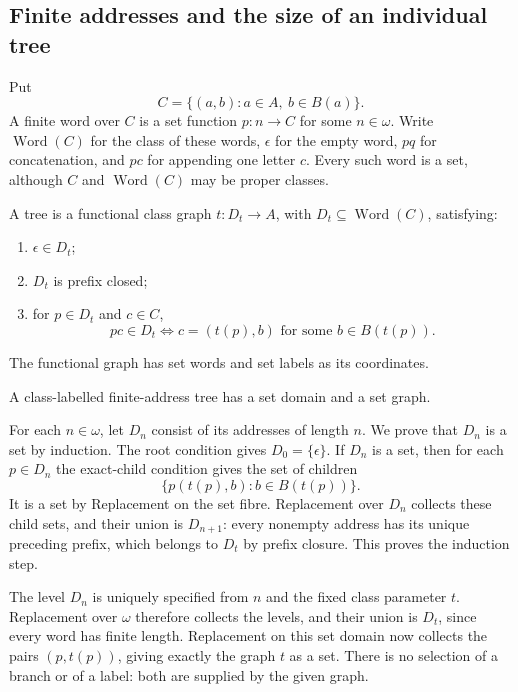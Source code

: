 \subsection{Finite addresses and the size of an individual tree}
Put
\[
C=\{(a,b):a\in A,\ b\in B(a)\}.
\]
A finite word over $C$ is a set function $p:n\to C$ for some
$n\in\omega$. Write $\operatorname{Word}(C)$ for the class of these
words, $\epsilon$ for the empty word, $pq$ for concatenation, and
$pc$ for appending one letter $c$. Every such word is a set, although
$C$ and $\operatorname{Word}(C)$ may be proper classes.

\begin{definition}
A tree is a functional class graph $t:D_t\to A$, with
$D_t\subseteq\operatorname{Word}(C)$, satisfying:
\begin{enumerate}
\item $\epsilon\in D_t$;
\item $D_t$ is prefix closed;
\item for $p\in D_t$ and $c\in C$,
\[
pc\in D_t\iff c=(t(p),b)\text{ for some }b\in B(t(p)).
\]
\end{enumerate}
The functional graph has set words and set labels as its coordinates.
\end{definition}

\begin{lemma}
\label{lem:class_tree_is_set}
A class-labelled finite-address tree has a set domain and a set graph.
\end{lemma}
\Proof
For each $n\in\omega$, let $D_n$ consist of its addresses of length
$n$. We prove that $D_n$ is a set by induction. The root condition
gives $D_0=\{\epsilon\}$. If $D_n$ is a set, then for each
$p\in D_n$ the exact-child condition gives the set of children
\[
\{p(t(p),b):b\in B(t(p))\}.
\]
It is a set by Replacement on the set fibre. Replacement over $D_n$
collects these child sets, and their union is $D_{n+1}$: every
nonempty address has its unique preceding prefix, which belongs to
$D_t$ by prefix closure. This proves the induction step.

The level $D_n$ is uniquely specified from $n$ and the fixed class
parameter $t$. Replacement over $\omega$ therefore collects the levels,
and their union is $D_t$, since every word has finite length.
Replacement on this set domain now collects the pairs $(p,t(p))$,
giving exactly the graph $t$ as a set. There is no selection of a
branch or of a label: both are supplied by the given graph.
\Done

